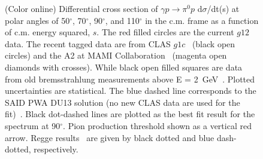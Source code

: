 \documentclass[aps,prc,twocolumn,floatfix,showpacs,preprintnumbers,amsmath,amssymb,superscriptaddress]{revtex4-1}
\begin{document}
\begin{figure}[htb!]
        \caption {(Color online) Differential cross section of 
		$\gamma p\to\pi^0p$ d$\sigma$/dt(s) at polar angles of
		50$^\circ$, 70$^\circ$, 90$^\circ$, and 
		110$^\circ$ in the c.m. frame as a function of c.m. 
		energy squared, $s$. The red filled circles are 
	    the current $g12$ data. The recent tagged data 
		are from CLAS $g1c$~\protect\cite{du07} (black 
		open circles) and the A2 at MAMI 
		Collaboration~\protect\cite{mami} (magenta open 
		diamonds with crosses). While black open filled 
		squares are data from old bremsstrahlung
		measurements above E = 2~GeV~\protect\cite{brem}. 
		Plotted uncertainties are statistical.  
		The blue dashed line corresponds to the SAID PWA 
		DU13 solution (no new CLAS data are used for the 
		fit)~\protect\cite{du13}.  Black dot-dashed lines 
		are plotted as the best fit result for the spectrum at
		90$^\circ$. Pion production threshold shown 
		as a vertical red arrow. Regge 
		results~\protect\cite{Goldstein,Laget} are given 
		by black dotted and blue dash-dotted, 
		respectively.} \label{fig:scaling}
\end{figure}
\end{document}
